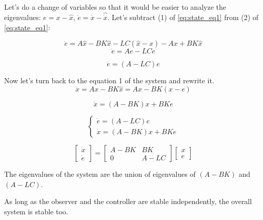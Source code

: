 
Let's do a change of variables so that it would be easier to analyze the eigenvalues:
$e = x - \hat x$, $\dot e = \dot x - \hat{\dot {x}}$. 
Let's subtract (1) of  \ref{eq:state_eq1} from (2) of \ref{eq:state_eq1}:

\[\dot e = A \hat x - BK \hat x - LC(\hat x - x) - Ax + BK \hat x \]
\[\dot e = A e - LCe\]

\begin{equation}
    \dot e = (A-LC)e
\end{equation}

Now let's turn back to the equation 1 of the system and rewrite it. 
\[\dot  x = Ax - BK \hat x = Ax - BK(x-e)\]

\begin{equation}
    \dot  x = (A-BK)x + BKe
\end{equation}

\[
\begin{cases}
    \dot e = (A - LC) e \\
    \dot x = (A - BK)x + BKe
\end{cases}
\] 

\[
\begin{bmatrix}
    \dot x \\ 
    \dot e
\end{bmatrix} = 
\begin{bmatrix}
    A-BK & BK \\ 
    0 & A - LC
\end{bmatrix} 
\begin{bmatrix}
    x \\ 
    e
\end{bmatrix}
\]

The eigenvalues of the system are the union of eigenvalues of $(A-  BK)$ and $(A-LC)$. 

\begin{tcolorbox}[colback=green!10,colframe=green!50!black,title=\textbf{Separation Principle}]
    As long as the observer and the controller are stable independently, the overall system is stable too. 
\end{tcolorbox}

